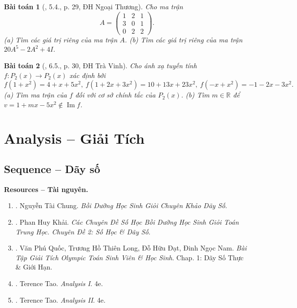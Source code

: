 \documentclass{article}
\newtheorem{baitoan}{Bài toán}
\begin{document}
\begin{baitoan}[\cite{VMS_VMC2024}, 5.4., p. 29, ĐH Ngoại Thương]
	Cho ma trận
	\begin{equation*}
		A = \begin{pmatrix}
			1 & 2 & 1\\3 & 0 & 1\\0 & 2 & 2
		\end{pmatrix}.
	\end{equation*}
	(a) Tìm các giá trị riêng của ma trận $A$. (b) Tìm các giá trị riêng của ma trận $20A^5 - 2A^2 + 4I$.
\end{baitoan}

\begin{baitoan}[\cite{VMS_VMC2024}, 6.5., p. 30, ĐH Trà Vinh]
	Cho ánh xạ tuyến tính $f:P_2(x)\to P_2(x)$ xác định bởi
	\begin{equation*}
		f(1 + x^2) = 4 + x + 5x^2,\ f(1 + 2x + 3x^2) = 10 + 13x + 23x^2,\ f(-x + x^2) = -1 - 2x - 3x^2.
	\end{equation*}
	(a) Tìm ma trận của $f$ đối với cơ sở chính tắc của $P_2(x)$. (b) Tìm $m\in\mathbb{R}$ để $v = 1 + mx - 5x^2\notin\operatorname{Im}f$.
\end{baitoan}


\section{Analysis -- Giải Tích}
\label{sect: analysis}

\subsection{Sequence -- Dãy số}
\textbf{\textsf{Resources -- Tài nguyên.}}
\begin{enumerate}
	\item \cite{Chung_day_so}. {\sc Nguyễn Tài Chung}. {\it Bồi Dưỡng Học Sinh Giỏi Chuyên Khảo Dãy Số}.
	\item \cite{Khai_so_hoc_day_so}. {\sc Phan Huy Khải}. {\it Các Chuyên Đề Số Học Bồi Dưỡng Học Sinh Giỏi Toán Trung Học. Chuyên Đề 2: Số Học \& Dãy Số}.
	\item \cite{Quoc_Long_Dat_Nam_VMC}. {\sc Văn Phú Quốc, Trương Hồ Thiên Long, Đỗ Hữu Đạt, Đinh Ngọc Nam}. {\it Bài Tập Giải Tích Olympic Toán Sinh Viên \& Học Sinh}. Chap. 1: Dãy Số Thực \& Giới Hạn.
	\item \cite{Tao_analysis_1}. {\sc Terence Tao}. {\it Analysis I}. 4e.
	\item \cite{Tao_analysis_2}. {\sc Terence Tao}. {\it Analysis II}. 4e.
\end{enumerate}
\end{document}

